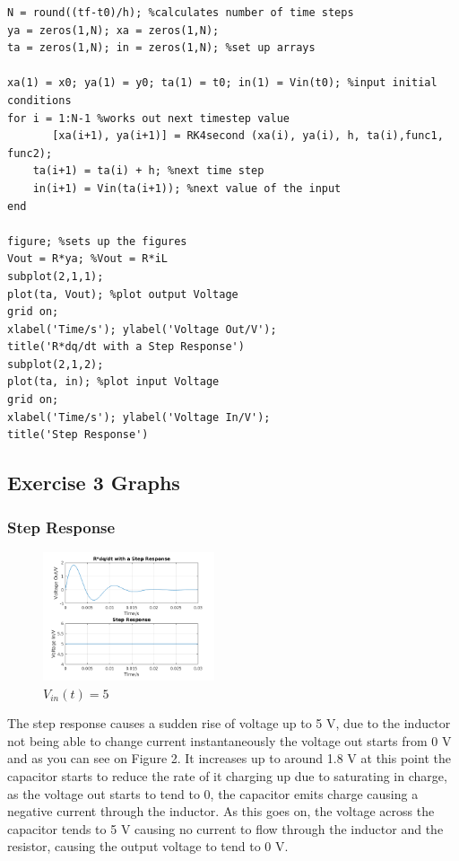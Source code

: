 \documentclass[11pt,a4paper]{article}
\begin{document}
\begin{verbatim}
N = round((tf-t0)/h); %calculates number of time steps
ya = zeros(1,N); xa = zeros(1,N);
ta = zeros(1,N); in = zeros(1,N); %set up arrays

xa(1) = x0; ya(1) = y0; ta(1) = t0; in(1) = Vin(t0); %input initial conditions
for i = 1:N-1 %works out next timestep value
	   [xa(i+1), ya(i+1)] = RK4second (xa(i), ya(i), h, ta(i),func1, func2);
    ta(i+1) = ta(i) + h; %next time step
    in(i+1) = Vin(ta(i+1)); %next value of the input
end

figure; %sets up the figures
Vout = R*ya; %Vout = R*iL
subplot(2,1,1);
plot(ta, Vout); %plot output Voltage
grid on;
xlabel('Time/s'); ylabel('Voltage Out/V');
title('R*dq/dt with a Step Response')
subplot(2,1,2);
plot(ta, in); %plot input Voltage
grid on;
xlabel('Time/s'); ylabel('Voltage In/V');
title('Step Response')
\end{verbatim}

\subsection{Exercise 3 Graphs}
\subsubsection{Step Response}

\begin{figure}

	\vspace{-6mm}
  		\includegraphics[width=0.45\textwidth]{Ex3_Figs/Step.png}
	\vspace{-6mm}
  	\caption{$V_{in}(t)= 5$}
  	\label{fig:ex3g1}

\end{figure}

    \vspace{0mm}The step response causes a sudden rise of voltage up to 5 V, due to the inductor not being able to change current instantaneously the voltage out starts from 0 V and as you can see on Figure 2. It increases up to around 1.8 V at this point the capacitor starts to reduce the rate of it charging up due to saturating in charge, as the voltage out starts to tend to 0, the capacitor emits charge causing a negative current through the inductor. As this goes on, the voltage across the capacitor tends to 5 V causing no current to flow through the inductor and the resistor, causing the output voltage to tend to 0 V.
\end{document}

